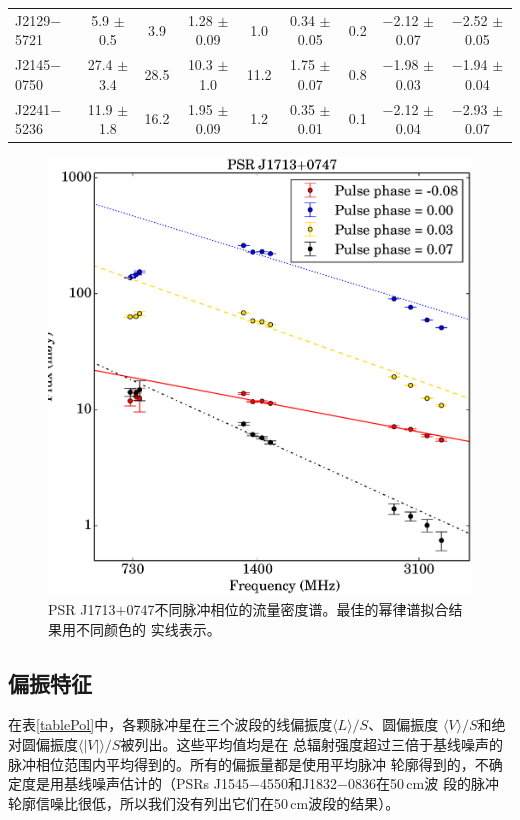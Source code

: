 \begin{landscape}
\begin{table}
\begin{tabular}{lcccccccc}
 J2129$-$5721  &  5.9   $\pm$ 0.5  &  3.9   &  1.28  $\pm$ 0.09 &  1.0  &  0.34 $\pm$ 0.05 &  0.2   &  $-$2.12 $\pm$ 0.07 &  $-$2.52 $\pm$ 0.05 \\ 
 J2145$-$0750  &  27.4  $\pm$ 3.4  &  28.5  &  10.3  $\pm$ 1.0  &  11.2 &  1.75 $\pm$ 0.07 &  0.8   &  $-$1.98 $\pm$ 0.03 &  $-$1.94 $\pm$ 0.04 \\ 
 J2241$-$5236  &  11.9  $\pm$ 1.8  &  16.2  &  1.95  $\pm$ 0.09 &  1.2  &  0.35 $\pm$ 0.01 &  0.1   &  $-$2.12 $\pm$ 0.04 &  $-$2.93 $\pm$ 0.07 \\ 
\hline
\end{tabular}
\end{table}
\end{landscape}

\begin{figure}
\begin{center}
\includegraphics[width=3 in]{1713phaseSI.ps}
\caption{PSR J1713$+$0747不同脉冲相位的流量密度谱。最佳的幂律谱拟合结果用不同颜色的
实线表示。} 
\label{1713SI}
\end{center}
\end{figure}

\subsection{偏振特征}

在表\ref{tablePol}中，各颗脉冲星在三个波段的线偏振度$\langle L \rangle/S$、圆偏振度
$\langle V \rangle/S$和绝对圆偏振度$\langle|V|\rangle/S$被列出。这些平均值均是在
总辐射强度超过三倍于基线噪声的脉冲相位范围内平均得到的。所有的偏振量都是使用平均脉冲
轮廓得到的，不确定度是用基线噪声估计的（PSRs J1545$-$4550和J1832$-$0836在50\,cm波
段的脉冲轮廓信噪比很低，所以我们没有列出它们在50\,cm波段的结果）。

